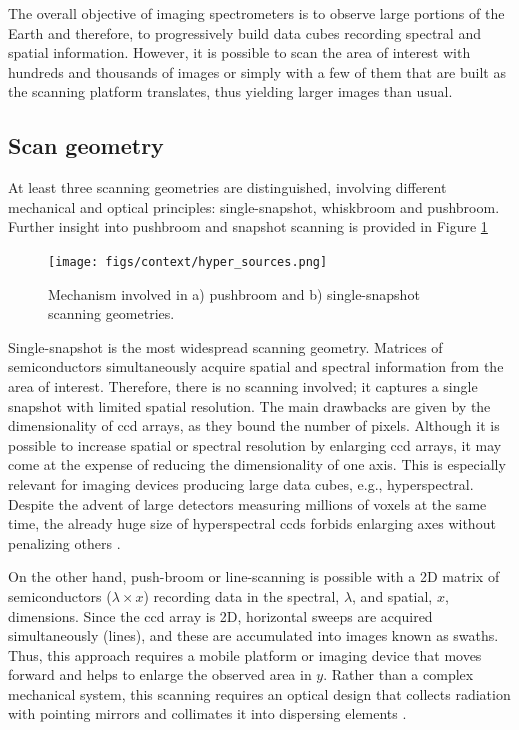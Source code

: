 The overall objective of imaging spectrometers is to observe large portions of the Earth and therefore, to progressively build data cubes recording spectral and spatial information. However, it is possible to scan the area of interest with hundreds and thousands of images or simply with a few of them that are built as the scanning platform translates, thus yielding larger images than usual. 

\subsection{Scan geometry}
\label{sec:fundamentals_optical_imaging_geometry}

At least three scanning geometries are distinguished, involving different mechanical and optical principles: single-snapshot, whiskbroom and pushbroom. Further insight into pushbroom and snapshot scanning is provided in Figure \ref{fig:hyper_scan_geometry} 

\begin{figure}[!ht]
	\texttt{[image: figs/context/hyper\_sources.png]}
	\caption{Mechanism involved in a) pushbroom and b) single-snapshot scanning geometries.}
    \label{fig:hyper_scan_geometry}
\end{figure}

Single-snapshot is the most widespread scanning geometry. Matrices of semiconductors simultaneously acquire spatial and spectral information from the area of interest. Therefore, there is no scanning involved; it captures a single snapshot with limited spatial resolution. The main drawbacks are given by the dimensionality of \acrshort{ccd} arrays, as they bound the number of pixels. Although it is possible to increase spatial or spectral resolution by enlarging \acrshort{ccd} arrays, it may come at the expense of reducing the dimensionality of one axis. This is especially relevant for imaging devices producing large data cubes, e.g., hyperspectral. Despite the advent of large detectors measuring millions of voxels at the same time, the already huge size of hyperspectral \acrshort{ccd}s forbids enlarging axes without penalizing others \cite{sousa_uav-based_2022, pu_hyperspectral_2017}. 

On the other hand, push-broom or line-scanning is possible with a 2D matrix of semiconductors ($\lambda \times x$) recording data in the spectral, $\lambda$, and spatial, $x$, dimensions. Since the \acrshort{ccd} array is 2D, horizontal sweeps are acquired simultaneously (lines), and these are accumulated into images known as swaths. Thus, this approach requires a mobile platform or imaging device that moves forward and helps to enlarge the observed area in $y$. Rather than a complex mechanical system, this scanning requires an optical design that collects radiation with pointing mirrors and collimates it into dispersing elements \cite{sousa_uav-based_2022, pu_hyperspectral_2017}. 

